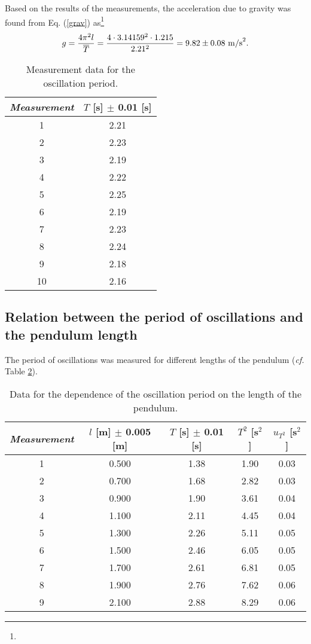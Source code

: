 \documentclass{article}
\begin{document}
Based on the results of the measurements, the acceleration due to gravity was found from Eq. (\ref{grav}) as\footnote{{}}
$$
g = \frac{4\pi^2l}{\overline{T}} = \frac{4\cdot 3.14159^2\cdot1.215}{2.21^2} = 9.82\pm 0.08 \ {\rm{m/s}}^2.
$$
\begin{table}
\begin{center}
\begin{tabular}{cc}
\hline
\textit{Measurement} & $T$ [s] $\pm$ 0.01 [s] \\
\hline
1	&	2.21\\
2	&	2.23\\
3	&	2.19\\
4	&	2.22\\
5	& 2.25\\
6	& 2.19\\
7	& 2.23\\
8	& 2.24\\
9	& 2.18\\
10	& 2.16\\
\hline
\end{tabular}
\caption{Measurement data for the oscillation period. \label{period}
{\color{blue}{Add an additional column if the uncertainties of the measurements are different.}}
}
\end{center}
\end{table}

\subsection{Relation between the period of oscillations and the pendulum length}

The period of oscillations was measured for different lengths of the pendulum (\textit{cf.} Table \ref{linear}).  

\begin{table}[h!]
\begin{center}
\begin{tabular}{ccccc}
\hline
\textit{Measurement} & $l$ [m] $\pm$ 0.005 [m] &$T$ [s] $\pm$ 0.01 [s] & $T^2$ [s$^2$] & $u_{T^2}$ [s$^2$] \\\hline
1	&0.500	&1.38	&1.90	&0.03\\
2	&0.700	&1.68	&2.82	&0.03\\
3	&0.900	&1.90	&3.61 	&0.04\\
4	&1.100	&2.11	&4.45	&0.04\\
5	&1.300	&2.26	&5.11	&0.05\\
6	&1.500	&2.46	&6.05	&0.05\\
7	&1.700	&2.61	&6.81	&0.05\\
8	&1.900	&2.76	&7.62	&0.06\\
9	&2.100	&2.88	&8.29	&0.06\\
\hline

\hline
\end{tabular}
\caption{Data for the dependence of the oscillation period on the length of the pendulum.\label{linear}}
\end{center}
\end{table}
\end{document}
